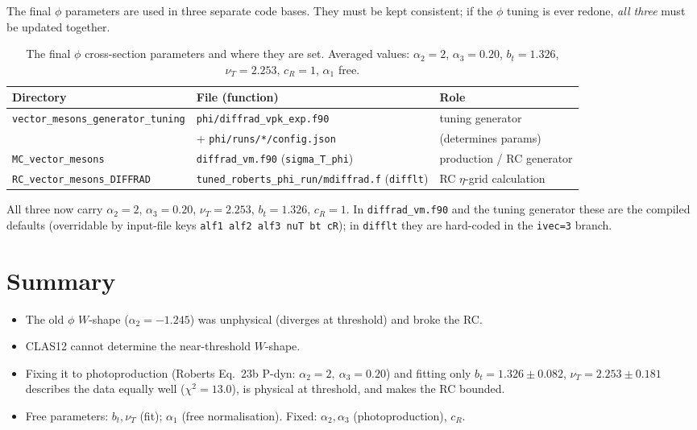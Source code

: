 \documentclass[11pt]{article}
\begin{document}
The final $\phi$ parameters are used in three separate code bases. They must be
kept consistent; if the $\phi$ tuning is ever redone, \emph{all three} must be
updated together.

\begin{table}[h]\centering
\caption{The final $\phi$ cross-section parameters and where they are set.
Averaged values: $\alpha_2=2$, $\alpha_3=0.20$, $b_t=1.326$, $\nu_T=2.253$,
$c_R=1$, $\alpha_1$ free.}
\small
\begin{tabular}{lll}
\toprule
Directory & File (function) & Role \\
\midrule
\texttt{vector\_mesons\_generator\_tuning} & \texttt{phi/diffrad\_vpk\_exp.f90}
& tuning generator \\
 & \quad + \texttt{phi/runs/*/config.json} & (determines params) \\
\texttt{MC\_vector\_mesons} & \texttt{diffrad\_vm.f90} (\texttt{sigma\_T\_phi})
& production / RC generator \\
\texttt{RC\_vector\_mesons\_DIFFRAD} &
\texttt{tuned\_roberts\_phi\_run/mdiffrad.f} (\texttt{difflt}) &
RC $\eta$-grid calculation \\
\bottomrule
\end{tabular}
\label{tab:dirs}
\end{table}

All three now carry $\alpha_2=2$, $\alpha_3=0.20$, $\nu_T=2.253$, $b_t=1.326$,
$c_R=1$. In \texttt{diffrad\_vm.f90} and the tuning generator these are the
compiled defaults (overridable by input-file keys
\texttt{alf1 alf2 alf3 nuT bt cR}); in \texttt{difflt} they are hard-coded in
the \texttt{ivec=3} branch.

\section{Summary}

\begin{itemize}
\item The old $\phi$ $W$-shape ($\alpha_2=-1.245$) was unphysical (diverges at
threshold) and broke the RC.
\item CLAS12 cannot determine the near-threshold $W$-shape.
\item Fixing it to photoproduction (Roberts Eq.~23b P-dyn:
$\alpha_2=2,\ \alpha_3=0.20$) and fitting only $b_t=1.326\pm0.082$,
$\nu_T=2.253\pm0.181$ describes the data equally well ($\chi^2=13.0$), is
physical at threshold, and makes the RC bounded.
\item Free parameters: $b_t,\nu_T$ (fit); $\alpha_1$ (free normalisation).
Fixed: $\alpha_2,\alpha_3$ (photoproduction), $c_R$.
\end{itemize}
\end{document}
